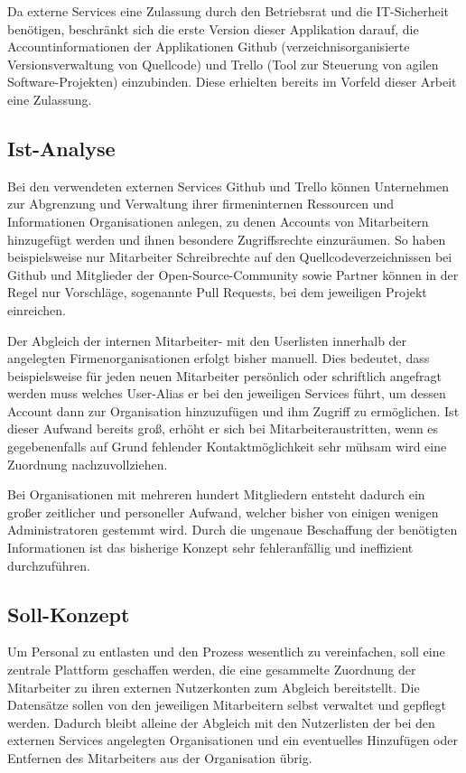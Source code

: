 Da externe Services eine Zulassung durch den Betriebsrat und die IT-Sicherheit benötigen, beschränkt
sich die erste Version dieser Applikation darauf, die Accountinformationen der Applikationen Github
(verzeichnisorganisierte Versionsverwaltung von Quellcode) und Trello (Tool zur Steuerung von
agilen Software-Projekten) einzubinden. Diese erhielten bereits im Vorfeld dieser Arbeit eine
Zulassung.

\subsection{Ist-Analyse}
\label{sec:Ist-Analyse}
Bei den verwendeten externen Services Github und Trello können Unternehmen zur Abgrenzung und
Verwaltung ihrer firmeninternen Ressourcen und Informationen Organisationen anlegen, zu
denen Accounts von Mitarbeitern hinzugefügt werden und ihnen besondere Zugriffsrechte einzuräumen.
So haben beispielsweise nur Mitarbeiter Schreibrechte auf den Quellcodeverzeichnissen bei Github und
Mitglieder der Open-Source-Community sowie Partner können in der Regel nur Vorschläge, sogenannte
Pull Requests, bei dem jeweiligen Projekt einreichen.

Der Abgleich der internen Mitarbeiter- mit den Userlisten innerhalb der angelegten Firmenorganisationen
erfolgt bisher manuell. Dies bedeutet, dass beispielsweise für jeden neuen
Mitarbeiter persönlich oder schriftlich angefragt werden muss welches User-Alias er bei den
jeweiligen Services führt, um dessen Account dann zur Organisation hinzuzufügen und ihm
Zugriff zu ermöglichen. Ist dieser Aufwand bereits groß, erhöht er sich bei Mitarbeiteraustritten,
wenn es gegebenenfalls auf Grund fehlender Kontaktmöglichkeit sehr mühsam wird eine Zuordnung
nachzuvollziehen.

Bei Organisationen mit mehreren hundert Mitgliedern entsteht dadurch ein großer zeitlicher und
personeller Aufwand, welcher bisher von einigen wenigen Administratoren gestemmt wird. Durch die
ungenaue Beschaffung der benötigten Informationen ist das bisherige Konzept sehr fehleranfällig und
ineffizient durchzuführen.

\subsection{Soll-Konzept}
\label{sec:Soll-Konzept}
Um Personal zu entlasten und den Prozess wesentlich zu vereinfachen, soll eine
zentrale Plattform geschaffen werden, die eine gesammelte Zuordnung der Mitarbeiter zu ihren
externen Nutzerkonten zum Abgleich bereitstellt. Die Datensätze sollen von den jeweiligen
Mitarbeitern selbst verwaltet und gepflegt werden. Dadurch bleibt alleine der Abgleich mit den
Nutzerlisten der bei den externen Services angelegten Organisationen und ein eventuelles Hinzufügen
oder Entfernen des Mitarbeiters aus der Organisation übrig.

